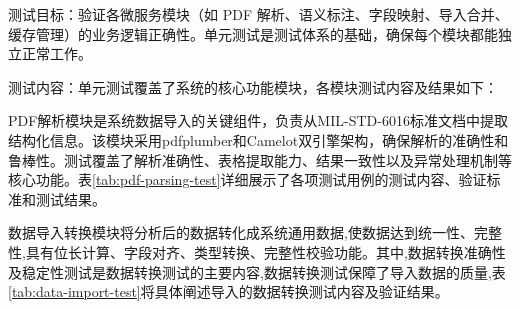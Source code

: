 测试目标：验证各微服务模块（如 PDF 解析、语义标注、字段映射、导入合并、缓存管理）的业务逻辑正确性。单元测试是测试体系的基础，确保每个模块都能独立正常工作。

测试内容：单元测试覆盖了系统的核心功能模块，各模块测试内容及结果如下：

PDF解析模块是系统数据导入的关键组件，负责从MIL-STD-6016标准文档中提取结构化信息。该模块采用pdfplumber和Camelot双引擎架构，确保解析的准确性和鲁棒性。测试覆盖了解析准确性、表格提取能力、结果一致性以及异常处理机制等核心功能。表\ref{tab:pdf-parsing-test}详细展示了各项测试用例的测试内容、验证标准和测试结果。

\begin{table}[H]
\centering
\caption{PDF解析模块单元测试结果}
\label{tab:pdf-parsing-test}
\end{table}

数据导入转换模块将分析后的数据转化成系统通用数据,使数据达到统一性、完整性,具有位长计算、字段对齐、类型转换、完整性校验功能。其中,数据转换准确性及稳定性测试是数据转换测试的主要内容,数据转换测试保障了导入数据的质量,表\ref{tab:data-import-test}将具体阐述导入的数据转换测试内容及验证结果。

\begin{table}[H]
\centering
\caption{数据导入转换模块单元测试结果}
\label{tab:data-import-test}
\end{table}

